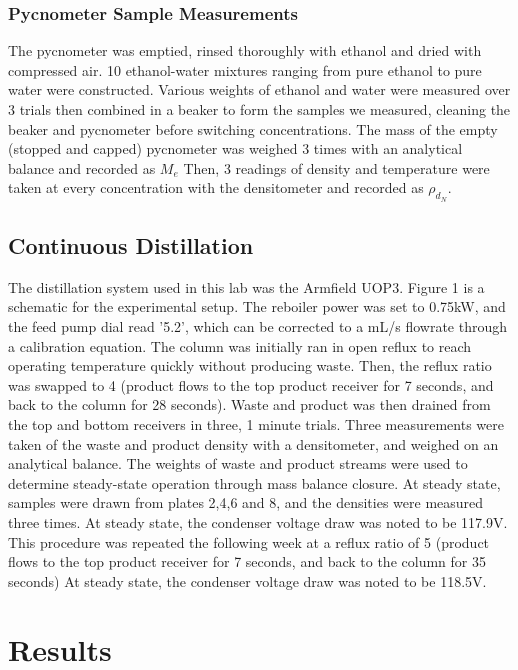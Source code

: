 \documentclass[lettersize,journal]{IEEEtran}
\begin{document}
	\subsubsection{Pycnometer Sample Measurements}
	The pycnometer was emptied, rinsed thoroughly with ethanol and dried with compressed air. 10 ethanol-water mixtures ranging from pure ethanol to pure water were constructed. Various weights of ethanol and water were measured over 3 trials then combined in a beaker to form the samples we measured, cleaning the beaker and pycnometer before switching concentrations. The mass of the empty (stopped and capped) pycnometer was weighed 3 times with an analytical balance and recorded as $M_{e}$ Then, 3 readings of density and temperature were taken at every concentration with the densitometer and recorded as $\rho_{d_N}$.
	\subsection{Continuous Distillation}
	The distillation system used in this lab was the Armfield UOP3. Figure 1 is a schematic for the experimental setup. The reboiler power was set to 0.75kW, and the feed pump dial read '5.2', which can be corrected to a mL/s flowrate through a calibration equation. The column was initially ran in open reflux to reach operating temperature quickly without producing waste. Then, the reflux ratio was swapped to 4 (product flows to the top product receiver for 7 seconds, and back to the column for 28 seconds).  Waste and product was then drained from the top and bottom receivers in three, 1 minute trials. Three measurements were taken of the waste and product density with a densitometer, and weighed on an analytical balance. The weights of  waste and product streams were used to determine steady-state operation through mass balance closure. At steady state, samples were drawn from plates 2,4,6 and 8, and the densities were measured three times. At steady state, the condenser voltage draw was noted to be 117.9V.
	This procedure was repeated the following week at a reflux ratio of 5 (product flows to the top product receiver for 7 seconds, and back to the column for 35 seconds) At steady state, the condenser voltage draw was noted to be 118.5V.
	\section{Results}
	
\end{document}
